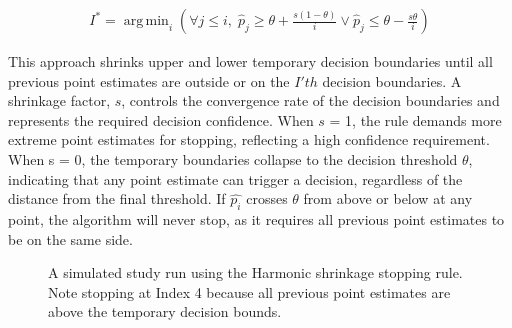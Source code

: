 \documentclass[sigconf,natbib=true,anonymous=true]{acmart}
\DeclareMathOperator*{\argmin}{arg\,min}
\begin{document}
 \begin{equation}
  \label{Harmonic Shrinkage Based Stopping}
  \begin{aligned}
  I^* = \argmin_{i}  \left( \forall j \leq i, \; \hat{p}_j \ge \theta  + \frac{s (1-\theta)}{i}  \lor \hat{p}_j \le \theta - \frac{s \theta}{i} \right)
  \end{aligned}
  \end{equation}

This approach shrinks upper and lower temporary decision boundaries until all previous point estimates are outside or on the $I'th$ decision boundaries. A shrinkage factor, $s$, controls the convergence rate of the decision boundaries and represents the required decision confidence. When $s$ = 1, the rule demands more extreme point estimates for stopping, reflecting a high confidence requirement. When s = $0$, the temporary boundaries collapse to the decision threshold $\theta$, indicating that any point estimate can trigger a decision, regardless of the distance from the final threshold. If $\hat{p_i}$ crosses $\theta$ from above or below at any point, the algorithm will never stop, as it requires all previous point estimates to be on the same side.



\begin{figure}
    \centering
    
    \caption{A simulated study run using the Harmonic shrinkage stopping rule. Note stopping at Index 4 because all previous point estimates are above the temporary decision bounds.}
    \label{fig:harmonic_shrinkage}
\end{figure}
\end{document}
